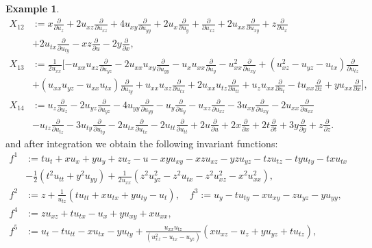 \documentclass[a4paper, 11pt]{amsart}
\theoremstyle{definition}
\newtheorem{example}[theorem]{Example}
\begin{document}
\begin{example}
\begin{align*}
X_{12}&:=x{\frac{\partial}{\partial{u_{z}}}}+2u_{xz}{\frac{\partial}{\partial{u_{xz}}}}+4u_{xy}{\frac{\partial}{\partial{u_{yy}}}}+2u_x{\frac{\partial}{\partial{u_{y}}}}+{\frac{\partial}{\partial{u_{xz}}}}+2u_{xx}{\frac{\partial}{\partial{u_{xy}}}}+z{\frac{\partial}{\partial{u_{x}}}}\\
&+2u_{tx}{\frac{\partial}{\partial{u_{ty}}}}-xz{\frac{\partial}{\partial{u}}}-2y{\frac{\partial}{\partial{x}}},\\
X_{13}&:=\frac{1}{2u_{xx}}[-u_{xx}u_{xz}{\frac{\partial}{\partial{u_{yz}}}}-2u_{xx}u_{xy}{\frac{\partial}{\partial{u_{yy}}}}-u_xu_{xx}{\frac{\partial}{\partial{u_{y}}}}-u_{xx}^2{\frac{\partial}{\partial{u_{xy}}}}+(u_{xz}^2-u_{yz}-u_{tx}){\frac{\partial}{\partial{u_{tz}}}}\\
&+(u_{xx}u_{yz}-u_{xx}u_{tx}){\frac{\partial}{\partial{u_{ty}}}}+u_{xx}u_{xz}{\frac{\partial}{\partial{u_{tx}}}}+2u_{xx}u_{tz}{\frac{\partial}{\partial{u_{tt}}}}+u_zu_{xx}{\frac{\partial}{\partial{u_t}}}-tu_{xx}{\frac{\partial}{\partial{z}}}+yu_{xx}{\frac{\partial}{\partial{x}}}],\\
X_{14}&:=u_{z}{\frac{\partial}{\partial{u_{z}}}}-2u_{yz}{\frac{\partial}{\partial{u_{yz}}}}-4u_{yy}{\frac{\partial}{\partial{u_{yy}}}}-u_y{\frac{\partial}{\partial{u_{y}}}}-u_{xz}{\frac{\partial}{\partial{u_{xz}}}}-3u_{xy}{\frac{\partial}{\partial{u_{xy}}}}-2u_{xx}{\frac{\partial}{\partial{u_{xx}}}}\\
&-u_{tz}{\frac{\partial}{\partial{u_{tz}}}}-3u_{ty}{\frac{\partial}{\partial{u_{ty}}}}-2u_{tx}{\frac{\partial}{\partial{u_{tx}}}}-2u_{tt}{\frac{\partial}{\partial{u_{tt}}}}+2u{\frac{\partial}{\partial{u}}}+2x{\frac{\partial}{\partial{x}}}+2t{\frac{\partial}{\partial{t}}}+3y{\frac{\partial}{\partial{y}}}+z{\frac{\partial}{\partial{z}}}.
\end{align*}
and after integration we obtain the following invariant functions:
\begin{align*}
f^1&:=tu_t+xu_x+yu_y+zu_z-u-xyu_{xy}-xzu_{xz}-yzu_{yz}-tzu_{tz}-tyu_{ty}-txu_{tx}\\
&-\frac{1}{2}(t^2u_{tt}+y^2u_{yy})+\frac{1}{2u_{xx}}(z^2u_{yz}^2-z^2u_{tx}-z^2u_{xz}^2-x^2u_{xx}^2),\\
f^2&:=z+\frac{1}{u_{tz}}(tu_{tt}+xu_{tx}+yu_{ty}-u_t),\quad f^3:=u_y-tu_{ty}-xu_{xy}-zu_{yz}-yu_{yy},\\
f^4&:=zu_{xz}+tu_{tx}-u_x+yu_{xy}+xu_{xx},\\
f^5&:=u_t-tu_{tt}-xu_{tx}-yu_{ty}+\frac{u_{xx}u_{tz}}{(u_{xz}^2-u_{tx}-u_{yz})}(xu_{xz}-u_z+yu_{yz}+tu_{tz}),\\

\end{align*}
\end{example}
\end{document}

